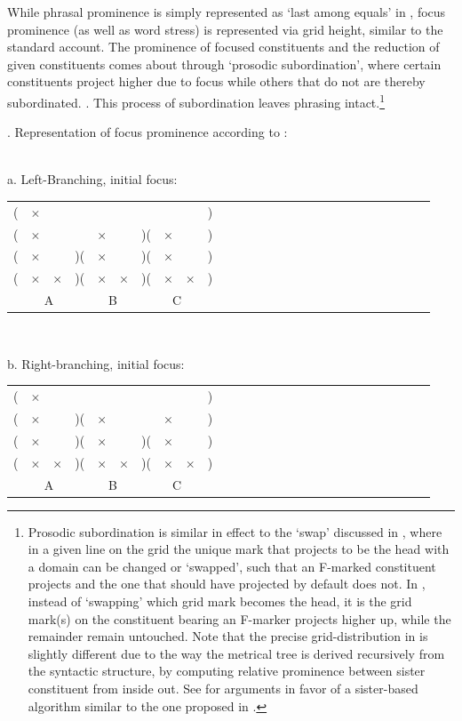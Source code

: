 \documentclass[preprint,review,12pt,authoryear,times]{elsarticle}
\newcommand{\g}{$\times$}
\begin{document}
While phrasal prominence is simply represented as `last among equals' in \citet{wagner05recursion}, focus prominence (as well as word stress) is represented via grid height, similar to the standard account. The prominence of focused constituents and the reduction of given constituents comes about through `prosodic subordination', where certain constituents project higher due to focus while others that do not are thereby subordinated. \citet{wagner05recursion}. This process of subordination  leaves phrasing intact.\footnote{Prosodic subordination is similar in effect to the `swap' discussed in \citet{burin10typology}, where in a given line on the grid the unique mark that projects to be the head with a domain can be changed or `swapped', such that an F-marked constituent projects and the one that should have projected by default does not. In \citet{wagner05recursion}, instead of `swapping' which grid mark becomes the head, it is the grid mark(s) on the constituent bearing an F-marker projects higher up, while the remainder remain untouched. Note that the precise grid-distribution in \citet{wagner05recursion} is slightly different due to the way the metrical tree is derived recursively from the syntactic structure, by computing relative prominence between sister constituent from inside out. See \citet{burin16b} for arguments in favor of a sister-based algorithm similar to the one proposed in  \citet{wagner05recursion}.}

\ex.  Representation of focus prominence according to  \citet{wagner05recursion,wagner10nllt}:\\\label{focpromYo}
\vspace{-10pt}
\ \\
\parbox{2in}{\footnotesize a. Left-Branching, initial focus:\\
\vspace{-12pt}
\setlength{\unitlength}{1cm}
 \setlength\extrarowheight{-3pt}
 \begin{tabular}{ccccccccccccccccccccccccccc}
(&\g&&&&&&&&)&\\
(&\g&&&\g&&)(&\g&&)&\\
(&\g&&)(&\g&&)(&\g&&)&\\
(&\g&\g&)(&\g&\g&)(&\g&\g&)&\\
\multicolumn{4}{c}{A}&\multicolumn{2}{c}{B}&\multicolumn{4}{c}{C}\\
\end{tabular}
}\parbox{0,45in}{\ }\parbox{2in}{\footnotesize b. Right-branching, initial focus:\\
\vspace{-12pt}
\setlength{\unitlength}{1cm}
 \setlength\extrarowheight{-3pt}
 \begin{tabular}{ccccccccccccccccccccccccccc}
(&\g&&&&&&&&)&\\
(&\g&&)(&\g&&&\g&&)&\\
(&\g&&)(&\g&&)(&\g&&)&\\
(&\g&\g&)(&\g&\g&)(&\g&\g&)&\\
\multicolumn{4}{c}{A}&\multicolumn{2}{c}{B}&\multicolumn{4}{c}{C}\\
\end{tabular}
}\label{libhi2}
\end{document}
